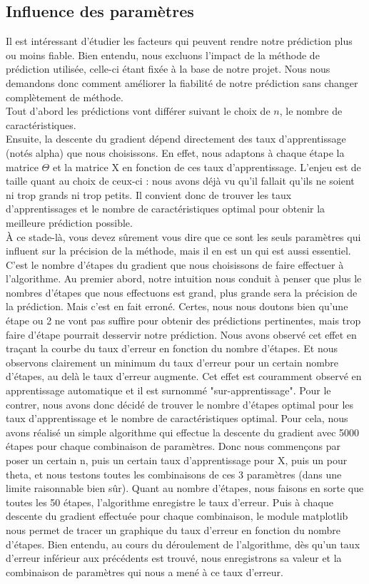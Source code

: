 \documentclass[a4paper,10pt]{article}
\begin{document}
\subsection{Influence des paramètres}

Il est intéressant d'étudier les facteurs qui peuvent rendre notre prédiction plus ou moins fiable. Bien entendu, nous excluons l'impact de la méthode de prédiction utilisée, celle-ci étant fixée à la base de notre projet. Nous nous demandons donc comment améliorer la fiabilité de notre prédiction sans changer complètement de méthode.\\

Tout d'abord les prédictions vont différer suivant le choix de $n$, le nombre de caractéristiques.\\
Ensuite, la descente du gradient dépend directement des taux d'apprentissage (notés alpha) que nous choisissons. En effet, nous adaptons à chaque étape la matrice $\Theta$ et la matrice X en fonction de ces taux d'apprentissage. L'enjeu est de taille quant au choix de ceux-ci : nous avons déjà vu qu'il fallait qu'ils ne soient ni trop grands ni trop petits. Il convient donc de trouver les taux d'apprentissages et le nombre de caractéristiques optimal pour obtenir la meilleure prédiction possible.\\
À ce stade-là, vous devez sûrement vous dire que ce sont les seuls paramètres qui influent sur la précision de la méthode, mais il en est un qui est aussi essentiel. C'est le nombre d'étapes du gradient que nous choisissons de faire effectuer à l'algorithme. Au premier abord, notre intuition nous conduit à penser que plus le nombres d'étapes que nous effectuons est grand, plus grande sera la précision de la prédiction. Mais c'est en fait erroné. Certes, nous nous doutons bien qu'une étape ou 2 ne vont pas suffire pour obtenir des prédictions pertinentes, mais trop faire d'étape pourrait desservir notre prédiction. Nous avons observé cet effet en traçant la courbe du taux d'erreur en fonction du nombre d'étapes. Et nous observons clairement un minimum du taux d'erreur pour un certain nombre d'étapes, au delà le taux d'erreur augmente. Cet effet est couramment observé en apprentissage automatique et il est surnommé "sur-apprentissage". Pour le contrer, nous avons donc décidé de trouver le nombre d'étapes optimal pour les taux d'apprentissage et le nombre de caractéristiques optimal.
Pour cela, nous avons réalisé un simple algorithme qui effectue la descente du gradient avec 5000 étapes pour chaque combinaison de paramètres. Donc nous commençons par poser un certain n, puis un certain taux d'apprentissage pour X, puis un pour theta, et nous testons toutes les combinaisons de ces 3 paramètres (dans une limite raisonnable bien sûr). Quant au nombre d'étapes, nous faisons en sorte que toutes les 50 étapes, l'algorithme enregistre le taux d'erreur. Puis à chaque descente du gradient effectuée pour chaque combinaison, le module matplotlib nous permet de tracer un graphique du taux d'erreur en fonction du nombre d'étapes. Bien entendu, au cours du déroulement de l'algorithme, dès qu'un taux d'erreur inférieur aux précédents est trouvé, nous enregistrons sa valeur et la combinaison de paramètres qui nous a mené à ce taux d'erreur.
\end{document}
